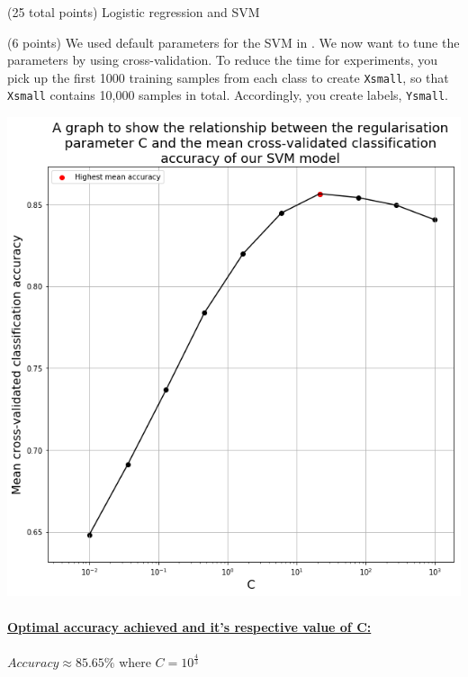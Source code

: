 \documentclass[12pt]{article}
\begin{document}
\begin{question}{(25 total points) Logistic regression and SVM}
\begin{subquestion}
   \end{subquestion}

   \begin{subquestion}{(6 points)
       We used default parameters for the SVM in .
       We now want to tune the parameters by using cross-validation.
       To reduce the time for experiments, you pick up the first 1000
       training samples from each class to create \texttt{Xsmall}, so that \texttt{Xsmall}
       contains 10,000 samples in total. Accordingly, you create
       labels, \texttt{Ysmall}.
     } \label{Q2.5}


   

      \begin{answerbox}{45em}
        \includegraphics[width=1\textwidth]{images/q25.png}
        \\
        \\
        \textbf{\underline{Optimal accuracy achieved and it's respective value of C:}} \\
        \\
        \footnotesize{$Accuracy \approx 85.65 \%$  where  $C = 10^{\frac{4}{3}}$}
      \end{answerbox}
  



\end{subquestion}
\end{question}
\end{document}

